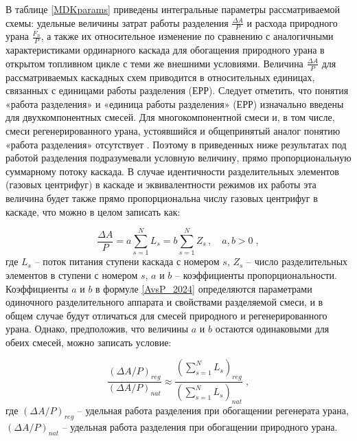 В таблице \ref{MDKparams} приведены интегральные параметры рассматриваемой схемы: удельные величины затрат работы разделения $\frac{\Delta A}{P}$ и расхода природного урана $\frac{F_n}{P}$, а также их относительное изменение по сравнению с аналогичными характеристиками ординарного каскада для обогащения природного урана в открытом топливном цикле с теми же внешними условиями. Величина $\frac{\Delta A}{P}$ для рассматриваемых каскадных схем приводится в относительных единицах, связанных с единицами работы разделения (ЕРР).
Следует отметить, что понятия «работа разделения» и «единица работы разделения» (ЕРР) изначально введены для двухкомпонентных смесей. Для многокомпонентной смеси и, в том числе, смеси регенерированного урана, устоявшийся и общепринятый аналог понятию «работа разделения» отсутствует \cite{2024sep_potential_ifz}. Поэтому в приведенных ниже результатах под работой разделения подразумевали условную величину, прямо пропорциональную суммарному потоку каскада. В случае идентичности разделительных элементов (газовых центрифуг) в каскаде и эквивалентности режимов их работы эта величина будет также прямо пропорциональна числу газовых центрифуг в каскаде, что можно в целом записать как:

\begin{equation}\label{AvsP_2024}
  \frac{\Delta A}{P}=a\sum_{s=1}^N L_s=b\sum_{s=1}^N Z_s \, ,\quad a,b>0 \; ,
\end{equation}
где $L_s$ -- поток питания ступени каскада с номером $s$, $Z_s$ --  число разделительных элементов в ступени с номером $s$, $a$ и $b$ -- коэффициенты пропорциональности. Коэффициенты $a$ и $b$ в формуле \ref{AvsP_2024} определяются параметрами одиночного разделительного аппарата и свойствами разделяемой смеси, и в общем случае будут отличаться для смесей природного и регенерированного урана. Однако, предположив, что величины $a$ и $b$  остаются одинаковыми для обеих смесей, можно записать условие:

\begin{equation}\label{AvsP_regnat_2024}
  \frac{(\Delta A/P)_{reg}}{(\Delta A/P)_{nat}} \approx \frac{(\sum_{s=1}^N L_s)_{reg}}{(\sum_{s=1}^N L_s)_{nat}} \; ,
\end{equation}
где $(\Delta A/P)_{reg}$ -- удельная работа разделения при обогащении регенерата урана,  $(\Delta A/P)_{nat}$ -- удельная работа разделения при обогащении природного урана.

